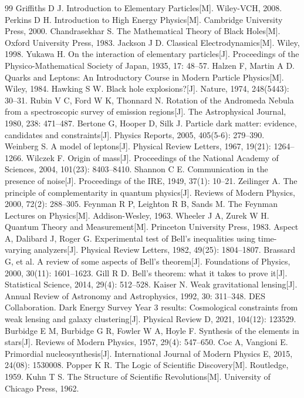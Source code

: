 \documentclass[12pt,a4paper]{article}
\begin{document}
\begin{thebibliography}{99}
 Griffiths D J. Introduction to Elementary Particles[M]. Wiley-VCH, 2008.
 Perkins D H. Introduction to High Energy Physics[M]. Cambridge University Press, 2000.
 Chandrasekhar S. The Mathematical Theory of Black Holes[M]. Oxford University Press, 1983.
 Jackson J D. Classical Electrodynamics[M]. Wiley, 1998.
 Yukawa H. On the interaction of elementary particles[J]. Proceedings of the Physico-Mathematical Society of Japan, 1935, 17: 48–57.
 Halzen F, Martin A D. Quarks and Leptons: An Introductory Course in Modern Particle Physics[M]. Wiley, 1984.
 Hawking S W. Black hole explosions?[J]. Nature, 1974, 248(5443): 30–31.
 Rubin V C, Ford W K, Thonnard N. Rotation of the Andromeda Nebula from a spectroscopic survey of emission regions[J]. The Astrophysical Journal, 1980, 238: 471–487.
 Bertone G, Hooper D, Silk J. Particle dark matter: evidence, candidates and constraints[J]. Physics Reports, 2005, 405(5-6): 279–390.
 Weinberg S. A model of leptons[J]. Physical Review Letters, 1967, 19(21): 1264–1266.
 Wilczek F. Origin of mass[J]. Proceedings of the National Academy of Sciences, 2004, 101(23): 8403–8410.
 Shannon C E. Communication in the presence of noise[J]. Proceedings of the IRE, 1949, 37(1): 10–21.
 Zeilinger A. The principle of complementarity in quantum physics[J]. Reviews of Modern Physics, 2000, 72(2): 288–305.
 Feynman R P, Leighton R B, Sands M. The Feynman Lectures on Physics[M]. Addison-Wesley, 1963.
 Wheeler J A, Zurek W H. Quantum Theory and Measurement[M]. Princeton University Press, 1983.
 Aspect A, Dalibard J, Roger G. Experimental test of Bell's inequalities using time-varying analyzers[J]. Physical Review Letters, 1982, 49(25): 1804–1807.
 Brassard G, et al. A review of some aspects of Bell's theorem[J]. Foundations of Physics, 2000, 30(11): 1601–1623.
 Gill R D. Bell's theorem: what it takes to prove it[J]. Statistical Science, 2014, 29(4): 512–528.
 Kaiser N. Weak gravitational lensing[J]. Annual Review of Astronomy and Astrophysics, 1992, 30: 311–348.
 DES Collaboration. Dark Energy Survey Year 3 results: Cosmological constraints from weak lensing and galaxy clustering[J]. Physical Review D, 2021, 104(12): 123529.
 Burbidge E M, Burbidge G R, Fowler W A, Hoyle F. Synthesis of the elements in stars[J]. Reviews of Modern Physics, 1957, 29(4): 547–650.
 Coc A, Vangioni E. Primordial nucleosynthesis[J]. International Journal of Modern Physics E, 2015, 24(08): 1530008.
 Popper K R. The Logic of Scientific Discovery[M]. Routledge, 1959.
 Kuhn T S. The Structure of Scientific Revolutions[M]. University of Chicago Press, 1962.
\end{thebibliography}
\end{document}
